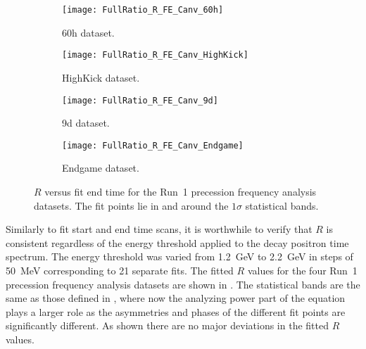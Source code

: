 \begin{figure}
\centering
    \begin{subfigure}[]{0.45\textwidth}
        \centering
        \texttt{[image: FullRatio\_R\_FE\_Canv\_60h]}
        \caption{60h dataset.}
    \end{subfigure}%
    \begin{subfigure}[]{0.45\textwidth}
        \centering
        \texttt{[image: FullRatio\_R\_FE\_Canv\_HighKick]}
        \caption{HighKick dataset.}
    \end{subfigure}

    \begin{subfigure}[]{0.45\textwidth}
        \centering
        \texttt{[image: FullRatio\_R\_FE\_Canv\_9d]}
        \caption{9d dataset.}
    \end{subfigure}%
    \begin{subfigure}[]{0.45\textwidth}
        \centering
        \texttt{[image: FullRatio\_R\_FE\_Canv\_Endgame]}
        \caption{Endgame dataset.}
    \end{subfigure}
\caption[$R$ versus fit end time]{$R$ versus fit end time for the Run~1 precession frequency analysis datasets. The fit points lie in and around the $1\sigma$ statistical bands.}
\label{fig:fitEndTime_R}
\end{figure}


Similarly to fit start and end time scans, it is worthwhile to verify that $R$ is consistent regardless of the energy threshold applied to the decay positron time spectrum. The energy threshold was varied from \SI{1.2}{\GeV} to \SI{2.2}{\GeV} in steps of \SI{50}{\MeV} corresponding to 21 separate fits. The fitted $R$ values for the four Run~1 precession frequency analysis datasets are shown in . The statistical bands are the same as those defined in , where now the analyzing power part of the equation plays a larger role as the asymmetries and phases of the different fit points are significantly different. As shown there are no major deviations in the fitted $R$ values.



